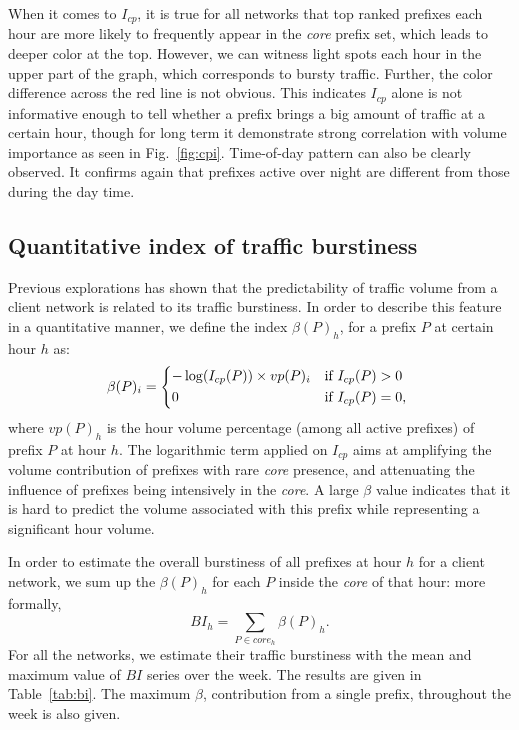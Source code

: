 When it comes to $I_{cp}$, it is true for all networks that top ranked prefixes each hour are more likely to frequently appear in the \textit{core} prefix set, which leads to deeper color at the top.
However, we can witness light spots each hour in the upper part of the graph, which corresponds to bursty traffic.
Further, the color difference across the red line is not obvious.
This indicates $I_{cp}$ alone is not informative enough to tell whether a prefix brings a big amount of traffic at a certain hour, though for long term it demonstrate strong correlation with volume importance as seen in Fig.~\ref{fig:cpi}.
Time-of-day pattern can also be clearly observed. It confirms again that prefixes active over night are different from those during the day time.


\subsection{Quantitative index of traffic burstiness}
Previous explorations has shown that the predictability of traffic volume from a client network is related to its traffic burstiness.
In order to describe this feature in a quantitative manner, we define the index $\beta(P)_h$, for a prefix $P$ at certain hour $h$ as:
\begin{equation*}
\beta(P)_i = \begin{dcases*}
         -\log(I_{cp}(P)) \times vp(P)_i & if $I_{cp}(P) > 0$\\
        0 & if $I_{cp}(P) = 0$,
        \end{dcases*}
\label{eq:beta}
\end{equation*}
where $vp(P)_h$ is the hour volume percentage (among all active prefixes) of prefix $P$ at hour $h$.
The logarithmic term applied on $I_{cp}$ aims at amplifying the volume contribution of prefixes with rare \textit{core} presence, and attenuating the influence of prefixes being intensively in the \textit{core}.
A large $\beta$ value indicates that it is hard to predict the volume associated with this prefix while representing a significant hour volume.

In order to estimate the overall burstiness of all prefixes at hour $h$ for a client network, we sum up the $\beta(P)_h$ for each $P$ inside the \textit{core} of that hour: more formally, 
\begin{equation*}
BI_h = \sum_{P \in \textit{core}_h} \beta(P)_h.
\label{eq:bi}
\end{equation*}
For all the networks, we estimate their traffic burstiness with the mean and maximum value of $BI$ series over the week. The results are given in Table~\ref{tab:bi}. The maximum $\beta$, contribution from a single prefix, throughout the week is also given.

